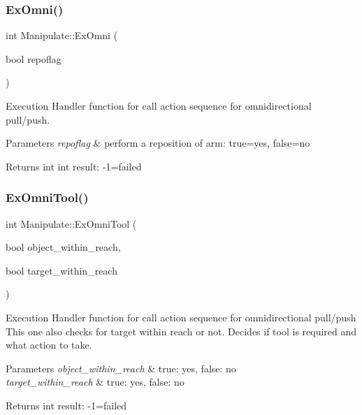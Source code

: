 \subsubsection{\texorpdfstring{Ex\+Omni()}{ExOmni()}}
{\footnotesize\ttfamily int Manipulate\+::\+Ex\+Omni (\begin{DoxyParamCaption}\item[{bool}]{repoflag }\end{DoxyParamCaption})\hspace{0.3cm}{\ttfamily [private]}}



Execution Handler function for call action sequence for omnidirectional pull/push. 


\begin{DoxyParams}{Parameters}
{\em repoflag} & perform a reposition of arm\+: true=yes, false=no \\
\hline
\end{DoxyParams}
\begin{DoxyReturn}{Returns}
int int result\+: -\/1=failed 
\end{DoxyReturn}
\mbox{\label{structManipulate_a5878c899118b3be92224c4b276ae06ff}} 
\subsubsection{\texorpdfstring{Ex\+Omni\+Tool()}{ExOmniTool()}}
{\footnotesize\ttfamily int Manipulate\+::\+Ex\+Omni\+Tool (\begin{DoxyParamCaption}\item[{bool}]{object\+\_\+within\+\_\+reach,  }\item[{bool}]{target\+\_\+within\+\_\+reach }\end{DoxyParamCaption})\hspace{0.3cm}{\ttfamily [private]}}



Execution Handler function for call action sequence for omnidirectional pull/push This one also checks for target within reach or not. Decides if tool is required and what action to take. 


\begin{DoxyParams}{Parameters}
{\em object\+\_\+within\+\_\+reach} & true\+: yes, false\+: no \\
\hline
{\em target\+\_\+within\+\_\+reach} & true\+: yes, false\+: no \\
\hline
\end{DoxyParams}
\begin{DoxyReturn}{Returns}
int result\+: -\/1=failed 
\end{DoxyReturn}
\mbox{\label{structManipulate_a3cc03e07441e7993cfa52d730196ac98}} 
